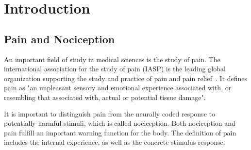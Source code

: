 \chapter{Introduction}
\begin{comment}
In this chapter I will give an introduction to the topic. I will give background information about neuropathic pain and the big picture goal of research in this field. \\
-quickly explain how the transmission of pain functions inside our bodies\\
-what is my bachelor thesis based on (paper from Roberto)\\
-contextualize thesis topic within the big picture \\
-talk quickly about openMNGlab and goal of adding analysis functionality and discuss software engineering goals for the framework\\

nociception/pain\\
neuropathic pain -> constant firing\\
measuring data -> microneurography\\
analyzing data -> openMNGlab\\
results -> ideas for problemsolving

C fibers
when these fibers fire all the time this is called neuropathic pain
\end{comment}
\section{Pain and Nociception}
An important field of study in medical sciences is the study of pain. The international association for the study of pain (IASP) is the leading global organization supporting the study and practice of pain and pain relief~\cite{iasp_2022}. It defines pain as "an unpleasant sensory and emotional experience associated with, or resembling that associated with, actual or potential tissue damage".

It is important to distinguish pain from the neurally coded response to potentially harmful stimuli, which is called nociception. Both nociception and pain fulfill an important warning function for the body. The definition of pain includes the internal experience, as well as the concrete stimulus response.


